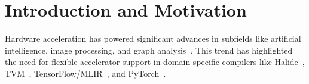 \chapter{Introduction and Motivation}
\label{sec:part1-motivation}







Hardware acceleration has powered significant advances
  in subfields like artificial intelligence, image processing, and graph analysis~\cite{han2016eie,chen2016eyeriss,reagen2016minerva,zhang2016cambricon,hameed2010understanding,ham2016graphicionado,jouppi2017tpu, krizhevsky2012conv, reuther2019survey}.
This trend has highlighted the need
  for flexible \gls{accelerator} support
  in domain-specific compilers like
  Halide~\cite{halide},
  TVM~\cite{chen2018tvm},
  TensorFlow/MLIR~\cite{abadi2016tensorflow,mlir}, and
  PyTorch~\cite{pytorch}.

